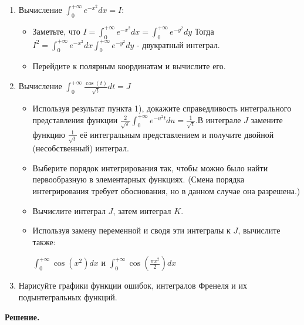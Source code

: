 \begin{enumerate}
    \item Вычисление $\int^{+\infty}_0 e^{-x^2} dx = I$:
    \begin{itemize}
        \item Заметьте, что $\displaystyle I = \int^{+\infty}_0 e^{-x^2} dx = \int_0^{+\infty} e^{-y^2} dy$
        Тогда $\displaystyle I^2 = \int^{+\infty}_0 e^{-x^2} dx \int_0^{+\infty} e^{-y^2} dy$ - двукратный интеграл.

        \item Перейдите к полярным координатам и вычислите его.
    \end{itemize}

    \item Вычисление $\displaystyle \int_0^{+\infty} \frac{\cos(t)}{\sqrt{t}} dt = J$
    \begin{itemize}
        \item Используя результат пункта 1), докажите справедливость интегрального представления функции
        $\displaystyle \frac{2}{\sqrt{\pi}} \int_0^{+\infty} e^{-u^2 t} du = \frac{1}{\sqrt{t}}$.В интеграле $J$ замените функцию $\frac{1}{\sqrt{t}}$ её интегральным представлением и получите двойной (несобственный) интеграл.

        \item Выберите порядок интегрирования так, чтобы можно было найти первообразную в элементарных функциях.
        (Смена порядка интегрирования требует обоснования, но в данном случае она разрешена.)

        \item Вычислите интеграл $J$, затем интеграл $K$.

        \item Используя замену переменной и сводя эти интегралы к $J$, вычислите также:

        $\displaystyle \int_0^{+\infty} \cos(x^2) dx$ и $\displaystyle \int_0^{+\infty} \cos(\frac{\pi x^2}{2}) dx$

    \end{itemize}

    \item Нарисуйте графики функции ошибок, интегралов Френеля и их подынтегральных функций.

\end{enumerate}

\vspace{10mm}
\textbf{Решение.}


